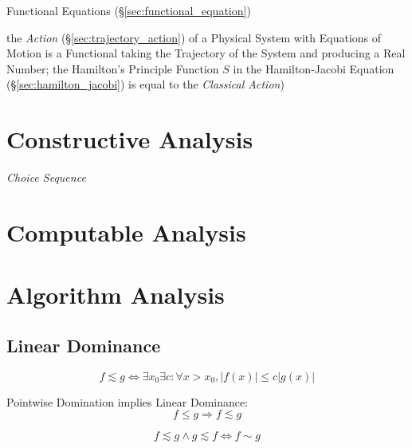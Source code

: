 \fist Functional Equations (\S\ref{sec:functional_equation})

the \emph{Action} (\S\ref{sec:trajectory_action}) of a Physical System with
Equations of Motion is a Functional taking the Trajectory of the System and
producing a Real Number; the Hamilton's Principle Function $S$ in the
Hamilton-Jacobi Equation (\S\ref{sec:hamilton_jacobi}) is equal to the
\emph{Classical Action})



\section{Constructive Analysis}\label{sec:constructive_analysis}

\emph{Choice Sequence}

\section{Computable Analysis}\label{sec:computable_analysis}

\section{Algorithm Analysis}\label{sec:algorithm_analysis}

\subsection{Linear Dominance}\label{sec:linear_dominance}

\[
    f \lesssim g \Leftrightarrow
    \exists x_0 \exists c : \forall x > x_0, |f(x)| \leq c |g(x)|
\]

Pointwise Domination implies Linear Dominance:
\[
    f \leq g \Rightarrow f \lesssim g
\]

\[
    f \lesssim g \wedge g \lesssim f \Leftrightarrow f \sim g
\]



